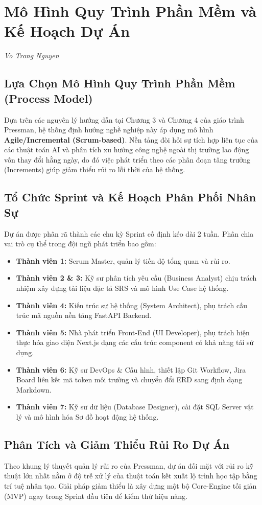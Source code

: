 \chapter{Mô Hình Quy Trình Phần Mềm và Kế Hoạch Dự Án}
\label{ch:quytrinh_duan}
\textit{Vo Trong Nguyen}

\section{Lựa Chọn Mô Hình Quy Trình Phần Mềm (Process Model)}
Dựa trên các nguyên lý hướng dẫn tại Chương 3 và Chương 4 của giáo trình Pressman, hệ thống định hướng nghề nghiệp này áp dụng mô hình \textbf{Agile/Incremental (Scrum-based)}. Nền tảng đòi hỏi sự tích hợp liên tục của các thuật toán AI và phân tích xu hướng công nghệ ngoài thị trường lao động vốn thay đổi hằng ngày, do đó việc phát triển theo các phân đoạn tăng trưởng (Increments) giúp giảm thiểu rủi ro lỗi thời của hệ thống.

\section{Tổ Chức Sprint và Kế Hoạch Phân Phối Nhân Sự}
Dự án được phân rã thành các chu kỳ Sprint cố định kéo dài 2 tuần. Phân chia vai trò cụ thể trong đội ngũ phát triển bao gồm:
\begin{itemize}
	\item \textbf{Thành viên 1:} Scrum Master, quản lý tiến độ tổng quan và rủi ro.
	\item \textbf{Thành viên 2 \& 3:} Kỹ sư phân tích yêu cầu (Business Analyst) chịu trách nhiệm xây dựng tài liệu đặc tả SRS và mô hình Use Case hệ thống.
	\item \textbf{Thành viên 4:} Kiến trúc sư hệ thống (System Architect), phụ trách cấu trúc mã nguồn nền tảng FastAPI Backend.
	\item \textbf{Thành viên 5:} Nhà phát triển Front-End (UI Developer), phụ trách hiện thực hóa giao diện Next.js dạng các cấu trúc component có khả năng tái sử dụng.
	\item \textbf{Thành viên 6:} Kỹ sư DevOps \& Cấu hình, thiết lập Git Workflow, Jira Board liên kết mã token môi trường và chuyển đổi ERD sang định dạng Markdown.
	\item \textbf{Thành viên 7:} Kỹ sư dữ liệu (Database Designer), cài đặt SQL Server vật lý và mô hình hóa Sơ đồ hoạt động hệ thống.
\end{itemize}

\section{Phân Tích và Giảm Thiểu Rủi Ro Dự Án}
Theo khung lý thuyết quản lý rủi ro của Pressman, dự án đối mặt với rủi ro kỹ thuật lớn nhất nằm ở độ trễ xử lý của thuật toán kết xuất lộ trình học tập bằng trí tuệ nhân tạo. Giải pháp giảm thiểu là xây dựng một bộ Core-Engine tối giản (MVP) ngay trong Sprint đầu tiên để kiểm thử hiệu năng.